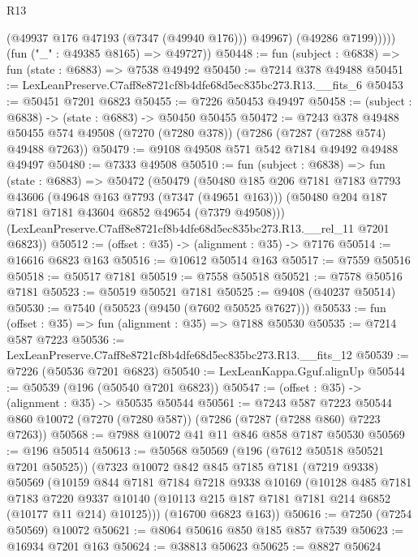 \begin{lexlean}{R13}
\begin{coremodule}
                (@49937 @176 @47193 (@7347 (@49940 @176)))
                @49967)
              (@49286 @7199)))))
      (fun ("_" : @49385 @8165) => @49727))
@50448 := fun (subject : @6838) => fun (state : @6883) => @7538 @49492
@50450 := @7214 @378 @49488
@50451 := LexLeanPreserve.C7aff8e8721cf8b4dfe68d5ec835bc273.R13.__fits_6
@50453 := @50451 @7201 @6823
@50455 := @7226 @50453 @49497
@50458 := (subject : @6838) -> (state : @6883) -> @50450 @50455
@50472 := @7243
    @378
    @49488
    @50455
    @574
    @49508
    (@7270 (@7280 @378))
    (@7286 (@7287 (@7288 @574) @49488 @7263))
@50479 := @9108 @49508 @571 @542 @7184 @49492 @49488 @49497
@50480 := @7333 @49508
@50510 := fun (subject : @6838) =>
  fun (state : @6883) =>
  @50472
    (@50479
      (@50480
        @185
        @206
        @7181
        @7183
        @7793
        @43606
        (@49648 @163 @7793 (@7347 (@49651 @163)))
        (@50480 @204 @187 @7181 @7181 @43604 @6852 @49654 (@7379 @49508)))
      (LexLeanPreserve.C7aff8e8721cf8b4dfe68d5ec835bc273.R13.__rel_11 @7201 @6823))
@50512 := (offset : @35) -> (alignment : @35) -> @7176
@50514 := @16616 @6823 @163
@50516 := @10612 @50514 @163
@50517 := @7559 @50516
@50518 := @50517 @7181
@50519 := @7558 @50518
@50521 := @7578 @50516 @7181
@50523 := @50519 @50521 @7181
@50525 := @9408 (@40237 @50514)
@50530 := @7540 (@50523 (@9450 (@7602 @50525 @7627)))
@50533 := fun (offset : @35) => fun (alignment : @35) => @7188 @50530
@50535 := @7214 @587 @7223
@50536 := LexLeanPreserve.C7aff8e8721cf8b4dfe68d5ec835bc273.R13.__fits_12
@50539 := @7226 (@50536 @7201 @6823)
@50540 := LexLeanKappa.Gguf.alignUp
@50544 := @50539 (@196 (@50540 @7201 @6823))
@50547 := (offset : @35) -> (alignment : @35) -> @50535 @50544
@50561 := @7243
    @587
    @7223
    @50544
    @860
    @10072
    (@7270 (@7280 @587))
    (@7286 (@7287 (@7288 @860) @7223 @7263))
@50568 := @7988 @10072 @41 @11 @846 @858 @7187 @50530
@50569 := @196 @50514
@50613 := @50568
    @50569
    (@196 (@7612 @50518 @50521 @7201 @50525))
    (@7323
      @10072
      @842
      @845
      @7185
      @7181
      (@7219 @9338)
      @50569
      (@10159
        @844
        @7181
        @7184
        @7218
        @9338
        @10169
        (@10128
          @485
          @7181
          @7183
          @7220
          @9337
          @10140
          (@10113 @215 @187 @7181 @7181 @214 @6852 (@10177 @11 @214) @10125)))
      (@16700 @6823 @163))
@50616 := @7250 (@7254 @50569) @10072
@50621 := @8064 @50616 @850 @185 @857 @7539
@50623 := @16934 @7201 @163
@50624 := @38813 @50623
@50625 := @8827 @50624

\end{coremodule}
\end{lexlean}
